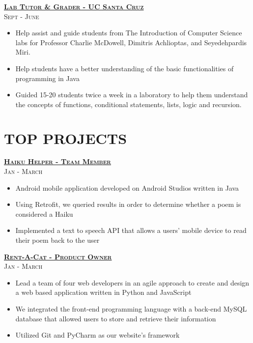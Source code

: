 \documentclass{Resume_Latex_Class}
\begin{document}
\begin{multicols}{2}
\bigskip\medskip

{\raggedleft\large\textsc\underline{\textbf{Lab Tutor \& Grader - UC Santa Cruz}}}\\
{\raggedleft\footnotesize\textsc{Sept   - June }}
\begin{itemize}[wide=0pt]
\item Help assist and guide students from The Introduction of Computer Science labs for Professor Charlie McDowell, Dimitris Achlioptas, and Seyedehpardis Miri. 
\item Help students have a better understanding of the basic functionalities of programming in Java
\item Guided 15-20 students twice a week in a laboratory to help them understand the concepts of functions, conditional statements, lists, logic and recursion.
\end{itemize}

\columnbreak 

\section{TOP PROJECTS}

{\raggedleft\large\textsc\underline{\textbf{Haiku Helper - Team Member}}}\\
{\raggedleft\footnotesize\textsc{Jan   - March }}
\begin{itemize}[wide=0pt]
\item {Android mobile application developed on Android Studios written in Java}
\item {Using Retrofit, we queried results in order to determine whether a poem is considered a Haiku}
\item {Implemented a text to speech API that allows a users' mobile device to read their poem back to the user}
\end{itemize}

{\raggedleft\large\textsc\underline{\textbf{Rent-A-Cat - Product Owner}}}\\
{\raggedleft\footnotesize\textsc{Jan   - March }}
\begin{itemize}[wide=0pt]
\item {Lead a team of four web developers in an agile approach to create and design a web based application written in Python and JavaScript}
\item {We integrated the front-end programming language with a back-end MySQL database that allowed users to store and retrieve their information}
\item {Utilized Git and PyCharm as our website's framework}
\end{itemize}



\end{multicols}
\end{document}
